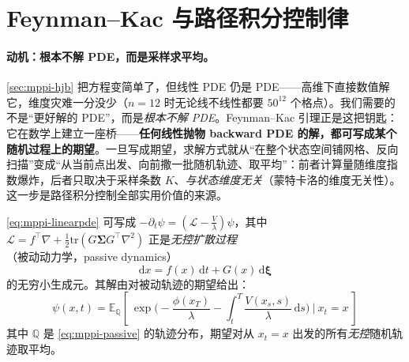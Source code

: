 \section{Feynman--Kac 与路径积分控制律}
\label{sec:mppi-fk}

\paragraph{动机：根本不解 PDE，而是采样求平均。}
\cref{sec:mppi-hjb} 把方程变简单了，但线性 PDE 仍是 PDE——高维下直接数值解它，维度灾难一分没少（$n=12$ 时无论线不线性都要 $50^{12}$ 个格点）。我们需要的不是“更好解的 PDE”，而是\emph{根本不解 PDE}。Feynman--Kac 引理正是这把钥匙：它在数学上建立一座桥——\textbf{任何线性抛物 backward PDE 的解，都可写成某个随机过程上的期望}\cite{kac1949distributions}。一旦写成期望，求解方式就从“在整个状态空间铺网格、反向扫描”变成“从当前点出发、向前撒一批随机轨迹、取平均”：前者计算量随维度指数爆炸，后者只取决于采样条数 $K$、\emph{与状态维度无关}（蒙特卡洛的维度无关性）。这一步是路径积分控制全部实用价值的来源。

\begin{theorem}\label{thm:mppi-feynmankac}
\cref{eq:mppi-linearpde} 可写成 $-\partial_t\psi=(\mathcal{L}-\tfrac{V}{\lambda})\psi$，其中 $\mathcal{L}=f^\top\nabla+\tfrac12\mathrm{tr}(G\boldsymbol{\Sigma}G^\top\nabla^2)$ 正是\emph{无控扩散过程}（被动动力学，passive dynamics）
\begin{equation}
  \mathrm{d}x=f(x)\,\mathrm{d}t+G(x)\,\mathrm{d}\boldsymbol{\xi}
  \label{eq:mppi-passive}
\end{equation}
的无穷小生成元。其解由对被动轨迹的期望给出：
\begin{equation}
  \boxed{\;\psi(x,t)=\mathbb{E}_{\mathbb{Q}}\!\left[\ \exp\!\Big(-\frac{\phi(x_T)}{\lambda}-\int_t^T\frac{V(x_s,s)}{\lambda}\,\mathrm{d}s\Big)\ \Bigg|\ x_t=x\ \right]\;}
  \label{eq:mppi-fk}
\end{equation}
其中 $\mathbb{Q}$ 是 \cref{eq:mppi-passive} 的轨迹分布，期望对从 $x_t=x$ 出发的所有\emph{无控}随机轨迹取平均。
\end{theorem}

